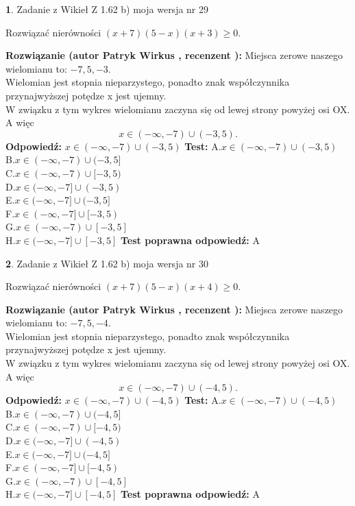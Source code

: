 \documentclass[12pt, a4paper]{article}
\theoremstyle{definition} %
\newtheorem{zad}{}
\newcommand{\zadStart}[1]{\begin{zad}#1\newline}
\newcommand{\zadStop}{\end{zad}}
\newcommand{\rozwStart}[2]{\noindent \textbf{Rozwiązanie (autor #1 , recenzent #2): }\newline}
\newcommand{\rozwStop}{\newline}
\newcommand{\odpStart}{\noindent \textbf{Odpowiedź:}\newline}
\newcommand{\odpStop}{\newline}
\newcommand{\testStart}{\noindent \textbf{Test:}\newline}
\newcommand{\testStop}{\newline}
\newcommand{\kluczStart}{\noindent \textbf{Test poprawna odpowiedź:}\newline}
\newcommand{\kluczStop}{\newline}
\begin{document}
\zadStart{Zadanie z Wikieł Z 1.62 b) moja wersja nr 29}

Rozwiązać nierówności $(x+7)(5-x)(x+3)\ge0$.
\zadStop
\rozwStart{Patryk Wirkus}{}
Miejsca zerowe naszego wielomianu to: $-7, 5, -3$.\\
Wielomian jest stopnia nieparzystego, ponadto znak współczynnika przy\linebreak najwyższej potędze x jest ujemny.\\ W związku z tym wykres wielomianu zaczyna się od lewej strony powyżej osi OX. A więc $$x \in (-\infty,-7) \cup (-3,5).$$
\rozwStop
\odpStart
$x \in (-\infty,-7) \cup (-3,5)$
\odpStop
\testStart
A.$x \in (-\infty,-7) \cup (-3,5)$\\
B.$x \in (-\infty,-7) \cup (-3,5]$\\
C.$x \in (-\infty,-7) \cup [-3,5)$\\
D.$x \in (-\infty,-7] \cup (-3,5)$\\
E.$x \in (-\infty,-7] \cup (-3,5]$\\
F.$x \in (-\infty,-7] \cup [-3,5)$\\
G.$x \in (-\infty,-7) \cup [-3,5]$\\
H.$x \in (-\infty,-7] \cup [-3,5]$
\testStop
\kluczStart
A
\kluczStop



\zadStart{Zadanie z Wikieł Z 1.62 b) moja wersja nr 30}

Rozwiązać nierówności $(x+7)(5-x)(x+4)\ge0$.
\zadStop
\rozwStart{Patryk Wirkus}{}
Miejsca zerowe naszego wielomianu to: $-7, 5, -4$.\\
Wielomian jest stopnia nieparzystego, ponadto znak współczynnika przy\linebreak najwyższej potędze x jest ujemny.\\ W związku z tym wykres wielomianu zaczyna się od lewej strony powyżej osi OX. A więc $$x \in (-\infty,-7) \cup (-4,5).$$
\rozwStop
\odpStart
$x \in (-\infty,-7) \cup (-4,5)$
\odpStop
\testStart
A.$x \in (-\infty,-7) \cup (-4,5)$\\
B.$x \in (-\infty,-7) \cup (-4,5]$\\
C.$x \in (-\infty,-7) \cup [-4,5)$\\
D.$x \in (-\infty,-7] \cup (-4,5)$\\
E.$x \in (-\infty,-7] \cup (-4,5]$\\
F.$x \in (-\infty,-7] \cup [-4,5)$\\
G.$x \in (-\infty,-7) \cup [-4,5]$\\
H.$x \in (-\infty,-7] \cup [-4,5]$
\testStop
\kluczStart
A
\kluczStop
\end{document}
